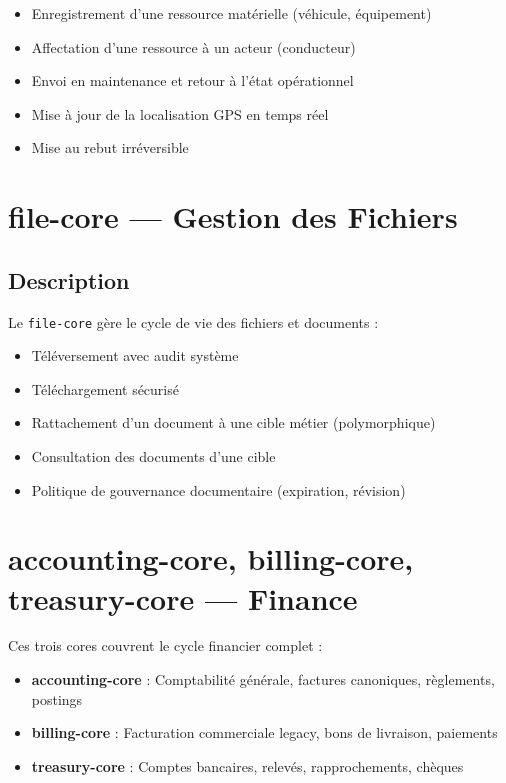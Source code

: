 \documentclass[12pt,a4paper]{report}
\begin{document}
\begin{itemize}[leftmargin=2cm]
  \item Enregistrement d'une ressource matérielle (véhicule, équipement)
  \item Affectation d'une ressource à un acteur (conducteur)
  \item Envoi en maintenance et retour à l'état opérationnel
  \item Mise à jour de la localisation GPS en temps réel
  \item Mise au rebut irréversible
\end{itemize}

\section{file-core — Gestion des Fichiers}

\subsection{Description}

Le \texttt{file-core} gère le cycle de vie des fichiers et documents :

\begin{itemize}[leftmargin=2cm]
  \item Téléversement avec audit système
  \item Téléchargement sécurisé
  \item Rattachement d'un document à une cible métier (polymorphique)
  \item Consultation des documents d'une cible
  \item Politique de gouvernance documentaire (expiration, révision)
\end{itemize}

\section{accounting-core, billing-core, treasury-core — Finance}

Ces trois cores couvrent le cycle financier complet :

\begin{itemize}[leftmargin=2cm]
  \item \textbf{accounting-core} : Comptabilité générale, factures canoniques, règlements, postings
  \item \textbf{billing-core} : Facturation commerciale legacy, bons de livraison, paiements
  \item \textbf{treasury-core} : Comptes bancaires, relevés, rapprochements, chèques
\end{itemize}
\end{document}

